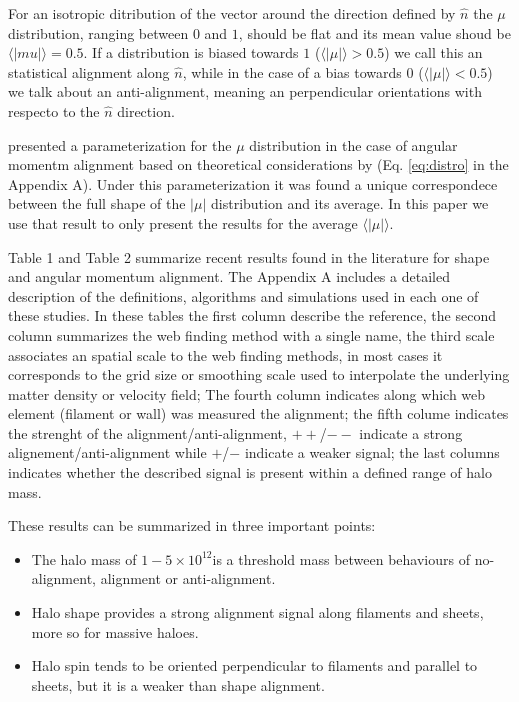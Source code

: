 \documentclass[useAMS,usenatbib]{mn2e}
\newcommand{\hMsun}{{\ifmmode{h^{-1}{\rm
        {M_{\odot}}}}\else{$h^{-1}{\rm{M_{\odot}}}$~}\fi}}
\begin{document}
For an isotropic ditribution of the vector around the direction defined by
$\hat{n}$ the $\mu$ distribution, ranging between $0$ and $1$, should
be flat and its mean value shoud be
$\langle|mu|\rangle=0.5$. If a distribution is biased towards $1$
($\langle\vert\mu\vert\rangle>0.5$) we call this an statistical
alignment along $\hat{n}$, while in the case of a bias towards $0$
($\langle\vert\mu\vert\rangle<0.5$) we talk about an anti-alignment,
meaning an perpendicular orientations with respecto to the $\hat{n}$
direction. 

\cite{Trowland2013} presented a parameterization for the $\mu$
distribution in the case of angular momentm alignment based on
theoretical considerations by \cite{Lee2005} (Eq. \ref{eq:distro} in
the Appendix A). Under this parameterization it was found a unique
correspondece between the full shape of the $\vert\mu\vert$
distribution and its average. In this paper we use that result to only
present the results for the average $\langle\vert\mu\vert\rangle$. 

Table 1 and Table 2 summarize recent results found in the literature for
shape and angular momentum alignment. The Appendix A includes a detailed
description of the definitions, algorithms and simulations used in
each one of these studies. In these tables the first column describe
the reference, the second column summarizes the web finding method
with a single name, the third scale associates an spatial scale to the
web finding methods, in most cases it corresponds to the grid size or
smoothing scale used to interpolate the underlying matter density or
velocity field; The fourth column indicates along which web element
(filament or wall) was measured the alignment; the fifth colume
indicates the strenght of the alignment/anti-alignment, $++$/$--$
indicate a strong alignement/anti-alignment while $+$/$-$ indicate a
weaker signal; the last columns indicates whether the described signal
is present within a defined range of halo mass.

These results can be summarized in three important points:
\begin{itemize}
\item The halo mass of $1-5\times 10^{12}$\hMsun is a threshold mass between
behaviours of no-alignment, alignment or anti-alignment.
\item Halo shape provides a strong alignment signal along filaments
  and sheets, more so for massive haloes. 
\item Halo spin tends to be oriented perpendicular to filaments and
parallel to sheets, but it is a weaker than shape alignment. 
\end{itemize}
\end{document}
